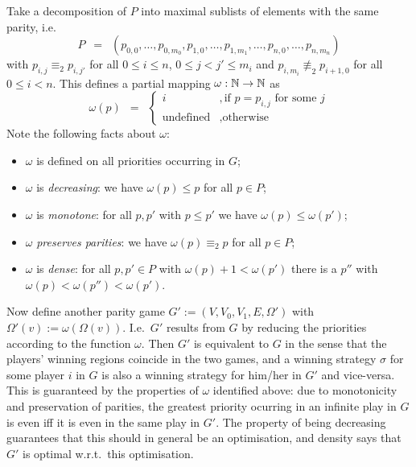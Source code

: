 Take a decomposition of $P$ into maximal sublists of elements with the same parity, i.e.\ 
\begin{displaymath}
P \enspace = \enspace (p_{0,0},\ldots,p_{0,m_0},p_{1,0},\ldots,p_{1,m_1},\ldots,p_{n,0},\ldots,p_{n,m_n})
\end{displaymath}
with $p_{i,j} \equiv_2 p_{i,j'}$ for all $0 \le i \le n$, $0 \le j < j' \le m_i$ and 
$p_{i,m_i} \not\equiv_2 p_{i+1,0}$ for all $0 \le i < n$. This defines a partial mapping $\omega: \mathbb{N} \to \mathbb{N}$ as 
\begin{displaymath}
\omega(p) \enspace = \enspace 
\begin{cases} 
i &, \mbox{if } p = p_{i,j} \mbox{ for some } j  \\
\mathrm{undefined} &, \mbox{otherwise}
\end{cases}
\end{displaymath}
Note the following facts about $\omega$:
\begin{itemize}
\item $\omega$ is defined on all priorities occurring in $G$;
\item $\omega$ is \emph{decreasing}: we have $\omega(p) \le p$ for all $p \in P$;
\item $\omega$ is \emph{monotone}: for all $p,p'$ with $p \le p'$ we have $\omega(p) \le \omega(p')$;
\item $\omega$ \emph{preserves parities}: we have $\omega(p) \equiv_2 p$ for all $p \in P$;
\item $\omega$ is \emph{dense}: for all $p,p' \in P$ with $\omega(p)+1 < \omega(p')$ there is a $p''$ with 
$\omega(p) < \omega(p'') < \omega(p')$.
\end{itemize} 
Now define another parity game $G' := (V,V_0,V_1,E,\Omega')$ with $\Omega'(v) := \omega(\Omega(v))$. I.e.\ $G'$
results from $G$ by reducing the priorities according to the function $\omega$. Then $G'$ is equivalent to $G$
in the sense that the players' winning regions coincide in the two games, and a winning strategy $\sigma$ for
some player $i$ in $G$ is also a winning strategy for him/her in $G'$ and vice-versa. This is guaranteed by the
properties of $\omega$ identified above: due to monotonicity and preservation of parities, the greatest priority
ocurring in an infinite play in $G$ is even iff it is even in the same play in $G'$. The property of being
decreasing guarantees that this should in general be an optimisation, and density says that $G'$ is optimal 
w.r.t.\ this optimisation. 
 
